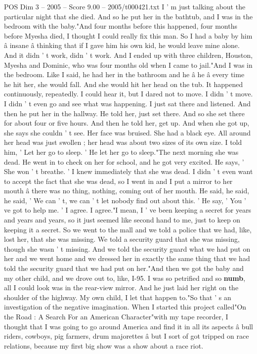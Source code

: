 \begin{textsample}{POS Dim 3 – 2005 – Score 9.00 – 2005/t000421.txt}
I ' m just talking about the particular night that she died.
And so he put her in the bathtub, and I was in the bedroom with the baby."And four months before this happened, four months before Myesha died, I thought I could really fix this man.
So I had a baby by him â insane â thinking that if I gave him his own kid, he would leave mine alone.
And it didn ' t work, didn ' t work.
And I ended up with three children, Houston, Myesha and Dominic, who was four months old when I came to jail."And I was in the bedroom.
Like I said, he had her in the bathroom and he â he â every time he hit her, she would fall.
And she would hit her head on the tub.
It happened continuously, repeatedly.
I could hear it, but I dared not to move.
I didn ' t move.
I didn ' t even go and see what was happening.
I just sat there and listened.
And then he put her in the hallway.
He told her, just set there.
And so she set there for about four or five hours.
And then he told her, get up.
And when she got up, she says she couldn ' t see.
Her face was bruised.
She had a black eye.
All around her head was just swollen ; her head was about two sizes of its own size.
I told him, ' Let her go to sleep. ' He let her go to sleep."The next morning she was dead.
He went in to check on her for school, and he got very excited.
He says, ' She won ' t breathe. ' I knew immediately that she was dead.
I didn ' t even want to accept the fact that she was dead, so I went in and I put a mirror to her mouth â there was no thing, nothing, coming out of her mouth.
He said, he said, he said, ' We can ' t, we can ' t let nobody find out about this. ' He say, ' You ' ve got to help me. ' I agree.
I agree."I mean, I ' ve been keeping a secret for years and years and years, so it just seemed like second hand to me, just to keep on keeping it a secret.
So we went to the mall and we told a police that we had, like, lost her, that she was missing.
We told a security guard that she was missing, though she wasn ' t missing.
And we told the security guard what we had put on her and we went home and we dressed her in exactly the same thing that we had told the security guard that we had put on her."And then we got the baby and my other child, and we drove out to, like, I-95.
I was so petrified and so \textbf{numb}, all I could look was in the rear-view mirror.
And he just laid her right on the shoulder of the highway.
My own child, I let that happen to."So that ' s an investigation of the negative imagination.
When I started this project called"On the Road : A Search For an American Character"with my tape recorder, I thought that I was going to go around America and find it in all its aspects â bull riders, cowboys, pig farmers, drum majorettes â but I sort of got tripped on race relations, because my first big show was a show about a race riot.

\end{textsample}
